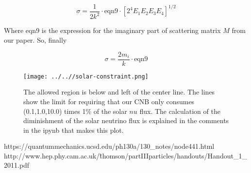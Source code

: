 \documentclass[reprint,onecolumn,superscriptaddress,preprintnumbers]{revtex4}%
\begin{document}
\begin{equation}
\sigma=\frac{1}{2k^2} \cdot \mathrm{eqn9} \cdot [2^4E_1E_2E_3E_4]^{1/2}
\end{equation}

Where eqn9 is the expression for the imaginary part of scattering matrix $M$ from our paper. So, finally

\begin{equation}
\sigma=\frac{2m_i}{k} \cdot \mathrm{eqn9}
\end{equation}


\begin{figure}[h]
\begin{centering}
\texttt{[image: ../..//solar-constraint.png]}
\caption{The allowed region is below and left of the center line. The lines show the limit for requiring that our CNB only consumes (0.1,1.0,10.0) times 1\% of the solar $nu$ flux. The calculation of the diminishment of the solar neutrino flux is explained in the comments in the ipynb that makes this plot.}
\end{centering}
\end{figure}


 

   
\begin{thebibliography}{9}
 https://quantummechanics.ucsd.edu/ph130a/130\_notes/node441.html
 http://www.hep.phy.cam.ac.uk/\~thomson/partIIIparticles/handouts/Handout\_1\_2011.pdf  
\end{thebibliography}
\end{document}
